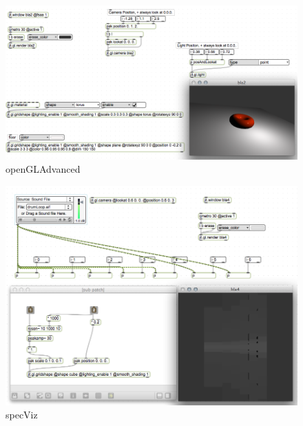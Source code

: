 \begin{figure}[h]
	\begin{center}
		\includegraphics[width = 14cm]{img/openGLAdvanced.png}
		\caption{openGLAdvanced}
		\label{fig:openGLAdvanced}
	\end{center}
\end{figure}


\begin{figure}[h]
	\begin{center}
		\includegraphics[width = 14cm]{img/specViz.png}
		\caption{specViz}
		\label{fig:specViz}
	\end{center}
\end{figure}



